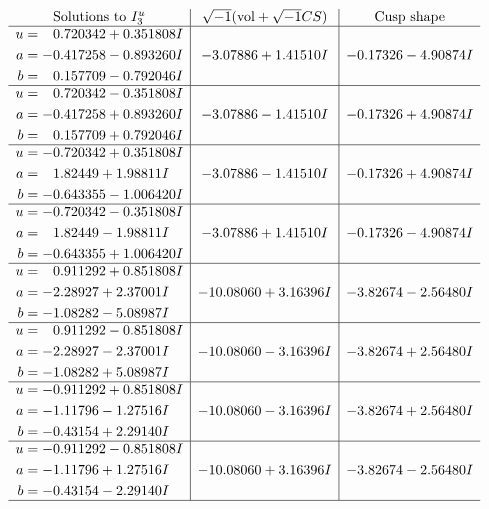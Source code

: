 \documentclass[1p]{elsarticle_modified}
\theoremstyle{definition}
\newcommand{\I}{\sqrt{-1}}
\begin{document}
$$\begin{array}{c|c|c}  
\text{Solutions to }I^u_{3}& \I (\text{vol} + \sqrt{-1}CS) & \text{Cusp shape}\\
 \hline 
\begin{aligned}
u &= \phantom{-}0.720342 + 0.351808 I \\
a &= -0.417258 - 0.893260 I \\
b &= \phantom{-}0.157709 - 0.792046 I\end{aligned}
 & -3.07886 + 1.41510 I & -0.17326 - 4.90874 I \\ \hline\begin{aligned}
u &= \phantom{-}0.720342 - 0.351808 I \\
a &= -0.417258 + 0.893260 I \\
b &= \phantom{-}0.157709 + 0.792046 I\end{aligned}
 & -3.07886 - 1.41510 I & -0.17326 + 4.90874 I \\ \hline\begin{aligned}
u &= -0.720342 + 0.351808 I \\
a &= \phantom{-}1.82449 + 1.98811 I \\
b &= -0.643355 - 1.006420 I\end{aligned}
 & -3.07886 - 1.41510 I & -0.17326 + 4.90874 I \\ \hline\begin{aligned}
u &= -0.720342 - 0.351808 I \\
a &= \phantom{-}1.82449 - 1.98811 I \\
b &= -0.643355 + 1.006420 I\end{aligned}
 & -3.07886 + 1.41510 I & -0.17326 - 4.90874 I \\ \hline\begin{aligned}
u &= \phantom{-}0.911292 + 0.851808 I \\
a &= -2.28927 + 2.37001 I \\
b &= -1.08282 - 5.08987 I\end{aligned}
 & -10.08060 + 3.16396 I & -3.82674 - 2.56480 I \\ \hline\begin{aligned}
u &= \phantom{-}0.911292 - 0.851808 I \\
a &= -2.28927 - 2.37001 I \\
b &= -1.08282 + 5.08987 I\end{aligned}
 & -10.08060 - 3.16396 I & -3.82674 + 2.56480 I \\ \hline\begin{aligned}
u &= -0.911292 + 0.851808 I \\
a &= -1.11796 - 1.27516 I \\
b &= -0.43154 + 2.29140 I\end{aligned}
 & -10.08060 - 3.16396 I & -3.82674 + 2.56480 I \\ \hline\begin{aligned}
u &= -0.911292 - 0.851808 I \\
a &= -1.11796 + 1.27516 I \\
b &= -0.43154 - 2.29140 I\end{aligned}
 & -10.08060 + 3.16396 I & -3.82674 - 2.56480 I\\
 \hline 
 \end{array}$$\newpage
\end{document}
